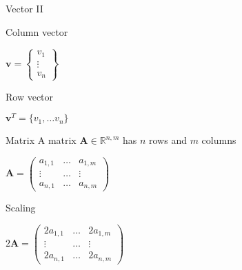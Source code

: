 \documentclass[12pt,t]{beamer}
\begin{document}
\begin{frame}{Vector II}

\begin{block}{Column vector}
\begin{center}
$\mathbf{v} = \left\lbrace \begin{matrix}
v_1 \\ \vdots \\ v_n 
\end{matrix} \right\rbrace$
\end{center}
\end{block}

\begin{block}{Row vector}
\begin{center}
$\mathbf{v}^T = \lbrace v_1,\ldots v_n\rbrace$
\end{center}
\end{block}

\end{frame}


\begin{frame}{Matrix}
A matrix $\mathbf{A}\in \mathbb{R}^{n,m}$ has $n$ rows and $m$ columns
\begin{center}
$
\mathbf{A} = \begin{pmatrix}
a_{1,1} & \ldots & a_{1,m} \\
\vdots & \ldots & \vdots \\
a_{n,1} & \ldots & a_{n,m} 
\end{pmatrix}
$
\end{center}

\begin{block}{Scaling}
\begin{center}
$ 2 \mathbf{A} = \begin{pmatrix}
2a_{1,1} & \ldots & 2a_{1,m} \\
\vdots & \ldots & \vdots \\
2a_{n,1} & \ldots & 2a_{n,m} 
\end{pmatrix} $
\end{center}
\end{block}

\end{frame}
\end{document}

